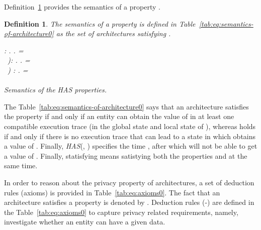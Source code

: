 \documentclass[a4paper]{article}
\newtheorem{ttd}{Definition}
\begin{document}
\noindent Definition~\ref{ttd:logsem} provides the semantics of a property .

\begin{ttd}
\label{ttd:logsem}  
The semantics  of a property  is defined in Table~\ref{tab:eq:semantics-of-architecture0} as the set of architectures satisfying .

\begin{table}[htb!]
        : .    . =      \\

    \,     ): .    . = \\

    \,      ) : . = \\

   \,          \\
\caption{Semantics of the HAS properties.}
\label{tab:eq:semantics-of-architecture0}
\end{table}
\end{ttd}

The Table~\ref{tab:eq:semantics-of-architecture0} says that an architecture satisfies the  property if and only if an entity  can obtain the value of  in at least one compatible execution trace  (in the global state  and local state  of ), whereas  holds if and only if there is no execution trace  that can lead to a state in which  obtains a 
value of . Finally, \textit{HAS}(, ) specifies the time , after which  will not be able to get a value of . Finally, statisfying    means satistying both the properties  and  at the same time. 
     
In order to reason about the privacy property of architectures, a set of deduction rules (axioms) is provided in Table~\ref{tab:eq:axioms0}. The fact that an architecture  satisfies a property  is denoted by   . Deduction rules (-) are defined in the Table~\ref{tab:eq:axioms0} to capture privacy related requirements, namely, investigate whether an entity can have a given data. 
\end{document}
